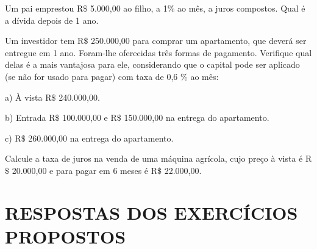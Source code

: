 \begin{exercicios}
\exitem{} Um pai emprestou R$\$$  5.000,00 ao filho, a 1$\%$  ao mês, a juros compostos. Qual é a dívida depois de 1 ano.

\exitem{} Um investidor tem R$\$$  250.000,00 para comprar um apartamento, que deverá ser entregue em 1 ano. Foram-lhe oferecidas três formas de pagamento. Verifique qual delas é a mais vantajosa para ele, considerando que o capital pode ser aplicado (se não for usado para pagar) com taxa de 0,6 $\%$  ao mês:

a) À vista R$\$$  240.000,00.

b) Entrada R$\$$  100.000,00 e R$\$$  150.000,00 na entrega do apartamento.

c) R$\$$  260.000,00 na entrega do apartamento.

\exitem{} Calcule a taxa de juros na venda de uma máquina agrícola, cujo preço à vista é R$\$$  20.000,00 e para pagar em 6 meses é R$\$$ 22.000,00.  
\end{exercicios}

\section{RESPOSTAS DOS EXERCÍCIOS PROPOSTOS}


